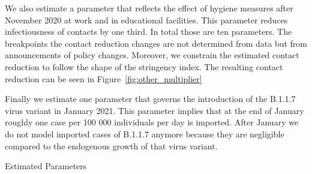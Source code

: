 We also estimate a parameter that reflects the effect of hygiene measures after November
2020 at work and in educational facilities. This parameter reduces infectiousness of
contacts by one third. In total those are ten parameters. The breakpoints the contact reduction
changes are not determined from data but from announcements of policy changes. Moreover,
we constrain the estimated contact reduction to follow the shape of the stringency index.
The resulting contact reduction can be seen in Figure~\ref{fig:other_multiplier}


Finally we estimate one parameter that governs the introduction of the B.1.1.7 virus
variant in January 2021. This parameter implies that at the end of January roughly one
case per 100 000 individuals per day is imported. After January we do not model imported
cases of B.1.1.7 anymore because they are negligible compared to the endogenous growth
of that virus variant.

\begin{table}[htb]
    \centering
    \caption{Estimated Parameters}
    \label{tab:estimated_params}
    
\end{table}
